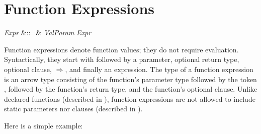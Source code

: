 %
%
%
%

\section{Function Expressions}

\begin{Grammar}
\emph{Expr} &::=&
 \emph{ValParam}   \EXP{\Rightarrow} \emph{Expr}\\
\end{Grammar}

Function expressions denote function values; they do not
require evaluation.  Syntactically,
they start with  followed by a parameter,
optional return type,
optional  clause,
$\Rightarrow$, and finally an expression.
The type of a function expression is an arrow type consisting of the
function's parameter type followed by the token \EXP{\rightarrow},
followed by the function's return type,
and the function's  optional  clause.
Unlike declared functions (described in
), function expressions are not
allowed to include static parameters
nor  clauses (described in ).


Here is a simple example:

